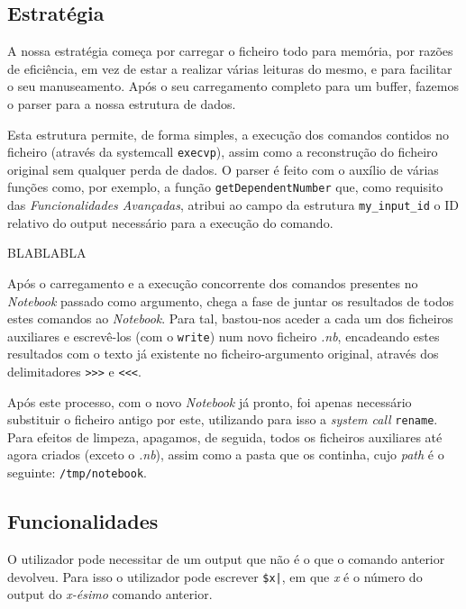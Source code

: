 \documentclass[a4paper]{article}
\begin{document}
\subsection{Estratégia}

A nossa estratégia começa por carregar o ficheiro todo para memória, por razões de eficiência, em vez de estar a realizar várias 
leituras do mesmo, e para facilitar o seu manuseamento. Após o seu carregamento completo para um buffer, fazemos o parser para a nossa 
estrutura de dados. 


Esta estrutura permite, de forma simples, a execução dos comandos contidos no ficheiro (através da systemcall \texttt{execvp}),
assim como a reconstrução do ficheiro original sem qualquer perda de dados. O parser é feito com o auxílio de várias funções como, por 
exemplo, a função \texttt {getDependentNumber} que, como requisito das \textit{Funcionalidades Avançadas}, atribui ao campo da 
estrutura \texttt{my\_input\_id} o ID relativo do output necessário para a execução do comando.

BLABLABLA

Após o carregamento e a execução concorrente dos comandos presentes no \textit{Notebook} passado como argumento, chega a fase de juntar os resultados 
de todos estes comandos ao \textit{Notebook}. Para tal, bastou-nos aceder a cada um dos ficheiros auxiliares e escrevê-los (com o \texttt{write}) num 
novo ficheiro \textit{.nb}, encadeando estes resultados com o texto já existente no ficheiro-argumento original, através dos delimitadores \texttt{>>>} e \texttt{<<<}. 

Após este processo, com o novo \textit{Notebook} já pronto, foi apenas necessário substituir o ficheiro antigo por este, utilizando para isso a \textit{system call} 
\texttt{rename}. Para efeitos de limpeza, apagamos, de seguida, todos os ficheiros auxiliares até agora criados (exceto o \textit{.nb}), assim como a pasta que os 
continha, cujo \textit{path} é o seguinte: \texttt{/tmp/notebook}.


\subsection{Funcionalidades}
\label{sec:funcionalidades}

O utilizador pode necessitar de um output que não é o que o comando anterior devolveu. Para isso o utilizador pode escrever 
\texttt{\$x|}, em que \textit{x} é o número do output do \textit{x-ésimo} comando anterior. 
\end{document}
